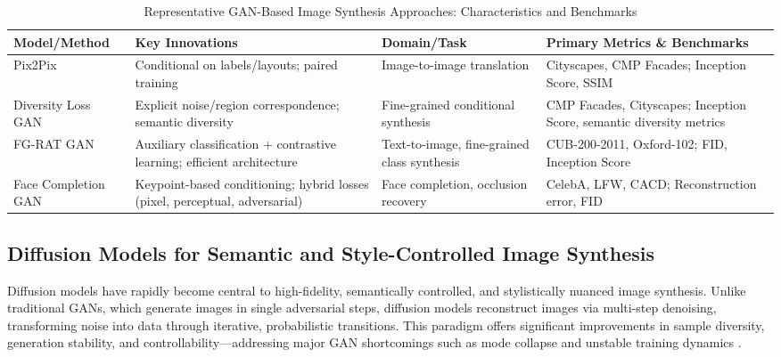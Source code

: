 \documentclass[sigconf]{acmart}
\begin{document}
\begin{table*}[htbp]
\centering
\caption{Representative GAN-Based Image Synthesis Approaches: Characteristics and Benchmarks}
\label{tab:gan_comparison}
\begin{adjustbox}{max width=\textwidth}
\begin{tabular}{@{}llll@{}}
\toprule
\textbf{Model/Method} & \textbf{Key Innovations} & \textbf{Domain/Task} & \textbf{Primary Metrics \& Benchmarks} \\
\midrule
Pix2Pix & Conditional on labels/layouts; paired training & Image-to-image translation & Cityscapes, CMP Facades; Inception Score, SSIM \\
Diversity Loss GAN & Explicit noise/region correspondence; semantic diversity & Fine-grained conditional synthesis & CMP Facades, Cityscapes; Inception Score, semantic diversity metrics \\
FG-RAT GAN & Auxiliary classification + contrastive learning; efficient architecture & Text-to-image, fine-grained class synthesis & CUB-200-2011, Oxford-102; FID, Inception Score \\
Face Completion GAN & Keypoint-based conditioning; hybrid losses (pixel, perceptual, adversarial) & Face completion, occlusion recovery & CelebA, LFW, CACD; Reconstruction error, FID \\
\bottomrule
\end{tabular}
\end{adjustbox}
\end{table*}

\subsection{Diffusion Models for Semantic and Style-Controlled Image Synthesis}

Diffusion models have rapidly become central to high-fidelity, semantically controlled, and stylistically nuanced image synthesis. Unlike traditional GANs, which generate images in single adversarial steps, diffusion models reconstruct images via multi-step denoising, transforming noise into data through iterative, probabilistic transitions. This paradigm offers significant improvements in sample diversity, generation stability, and controllability—addressing major GAN shortcomings such as mode collapse and unstable training dynamics \cite{ref76,ref90}.
\end{document}
